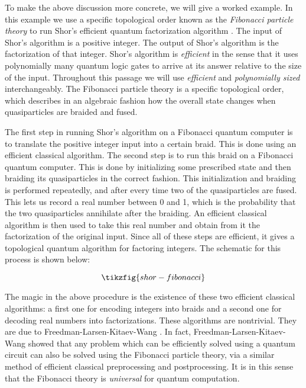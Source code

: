 \begin{ex}
To make the above discussion more concrete, we will give a worked example. In this example we use a specific topological order known as the {\em Fibonacci particle theory} to run Shor’s efficient quantum factorization algorithm \cite{shor1994algorithms}. The input of Shor’s algorithm is a positive integer. The output of Shor’s algorithm is the factorization of that integer. Shor’s algorithm is {\em efficient} in the sense that it uses polynomially many quantum logic gates to arrive at its answer relative to the size of the input. Throughout this passage we will use {\em efficient} and {\em polynomially sized} interchangeably. The Fibonacci particle theory is a specific topological order, which describes in an algebraic fashion how the overall state changes when quasiparticles are braided and fused.

The first step in running Shor’s algorithm on a Fibonacci quantum computer is to translate the positive integer input into a certain braid. This is done using an efficient classical algorithm. The second step is to run this braid on a Fibonacci quantum computer. This is done by initializing some prescribed state and then braiding its quasiparticles in the correct fashion. This initialization and braiding is performed repeatedly, and after every time two of the quasiparticles are fused. This lets us record a real number between 0 and 1, which is the probability that the two quasiparticles annihilate after the braiding. An efficient classical algorithm is then used to take this real number and obtain from it the factorization of the original input. Since all of these steps are efficient, it gives a topological quantum algorithm for factoring integers. The schematic for this process is shown below:

\begin{equation*}
\tikzfig{shor-fibonacci}
\end{equation*}

The magic in the above procedure is the existence of these two efficient classical algorithms: a first one for encoding integers into braids and a second one for decoding real numbers into factorizations. These algorithms are nontrivial. They are due to Freedman-Larsen-Kitaev-Wang \cite{freedman2002modular}. In fact, Freedman-Larsen-Kitaev-Wang showed that any problem which can be efficiently solved using a quantum circuit can also be solved using the Fibonacci particle theory, via a similar method of efficient classical preprocessing and postprocessing. It is in this sense that the Fibonacci theory is {\em universal} for quantum computation.
\end{ex}

